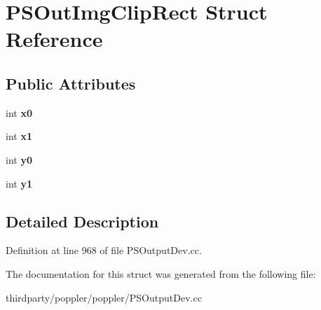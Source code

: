 \hypertarget{struct_p_s_out_img_clip_rect}{}\section{P\+S\+Out\+Img\+Clip\+Rect Struct Reference}
\label{struct_p_s_out_img_clip_rect}
\subsection*{Public Attributes}
\begin{DoxyCompactItemize}
\item 
\mbox{\label{struct_p_s_out_img_clip_rect_ada5a5ede9ac2b91b0df6bd184b431795}} 
int {\bfseries x0}
\item 
\mbox{\label{struct_p_s_out_img_clip_rect_a90ee3d7293163722b54c47ec1bb07cea}} 
int {\bfseries x1}
\item 
\mbox{\label{struct_p_s_out_img_clip_rect_a5c7d9a4afaf720779bcf15ddeb9e3f64}} 
int {\bfseries y0}
\item 
\mbox{\label{struct_p_s_out_img_clip_rect_a92c6cf9fdbc8a5ffe798a82d7ab4b3dd}} 
int {\bfseries y1}
\end{DoxyCompactItemize}


\subsection{Detailed Description}


Definition at line 968 of file P\+S\+Output\+Dev.\+cc.



The documentation for this struct was generated from the following file\+:\begin{DoxyCompactItemize}
\item 
thirdparty/poppler/poppler/P\+S\+Output\+Dev.\+cc\end{DoxyCompactItemize}
